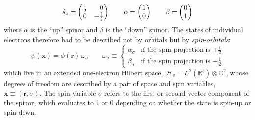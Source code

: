 \begin{equation}
    \hat{s}_z
    =
    \begin{pmatrix}
        \tfrac{1}{2} & \hphantom{+}0 \\
        0 & -\tfrac{1}{2}
    \end{pmatrix}
    \qquad
    \alpha
    =
    \begin{pmatrix}
        1 \\ 0
    \end{pmatrix}
    \qquad
    \beta
    =
    \begin{pmatrix}
        0 \\ 1
    \end{pmatrix}
\end{equation}
where \(\alpha\) is the ``up'' spinor and \(\beta\) is the ``down'' spinor.
The states of individual electrons therefore had to be described not by orbitals
but by {\itshape spin-orbitals}:
\begin{equation}
    \psi(\mathbf{x})
    =
    \phi(\mathbf{r})\,
    \omega_\sigma
    \qquad
    \omega_\sigma
    \equiv
    \left\{
        \begin{array}{cl}
            \alpha_{\sigma}
            &
            \text{if the spin projection is \(+\tfrac{1}{2}\)}
            \\[10pt]
            \beta_{\sigma}
            &
            \text{if the spin projection is \(-\tfrac{1}{2}\)}
        \end{array}
    \right.
\end{equation}
which live in an extended one-electron Hilbert space,
\(
    \mathcal{H}_\mathrm{e}
    =
    L^2(\mathbb{R}^3)
    \otimes
    \mathbb{C}^2
\),
whose degrees of freedom are described by a pair of space and spin variables,
\(
    \mathbf{x}
    \equiv
    (\mathbf{r},\sigma)
\).
The spin variable \(\sigma\) refers to the first or second vector component of
the spinor, which evaluates to 1 or 0 depending on whether the state is spin-up
or spin-down.

